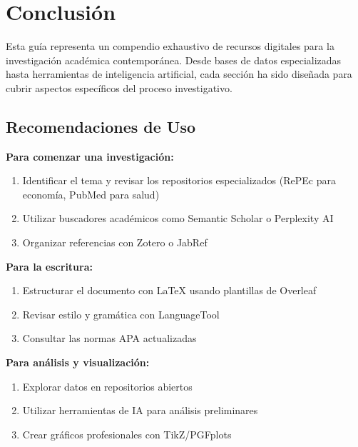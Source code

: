\documentclass[
  jou,
  floatsintext,
  longtable,
  a4paper,
  nolmodern,
  notxfonts,
  notimes,
  12pt,
  colorlinks=true,linkcolor=blue,citecolor=blue,urlcolor=blue]{apa7}
\providecommand{\tightlist}{%
  \setlength{\itemsep}{0pt}\setlength{\parskip}{0pt}}
\begin{document}
\section{Conclusión}\label{conclusiuxf3n}

Esta guía representa un compendio exhaustivo de recursos digitales para
la investigación académica contemporánea. Desde bases de datos
especializadas hasta herramientas de inteligencia artificial, cada
sección ha sido diseñada para cubrir aspectos específicos del proceso
investigativo.

\subsection{Recomendaciones de Uso}\label{recomendaciones-de-uso}

\textbf{Para comenzar una investigación:}

\begin{enumerate}
\def\labelenumi{\arabic{enumi}.}
\tightlist
\item
  Identificar el tema y revisar los repositorios especializados (RePEc
  para economía, PubMed para salud)
\item
  Utilizar buscadores académicos como Semantic Scholar o Perplexity AI
\item
  Organizar referencias con Zotero o JabRef
\end{enumerate}

\textbf{Para la escritura:}

\begin{enumerate}
\def\labelenumi{\arabic{enumi}.}
\tightlist
\item
  Estructurar el documento con LaTeX usando plantillas de Overleaf
\item
  Revisar estilo y gramática con LanguageTool
\item
  Consultar las normas APA actualizadas
\end{enumerate}

\textbf{Para análisis y visualización:}

\begin{enumerate}
\def\labelenumi{\arabic{enumi}.}
\tightlist
\item
  Explorar datos en repositorios abiertos
\item
  Utilizar herramientas de IA para análisis preliminares
\item
  Crear gráficos profesionales con TikZ/PGFplots
\end{enumerate}
\end{document}
